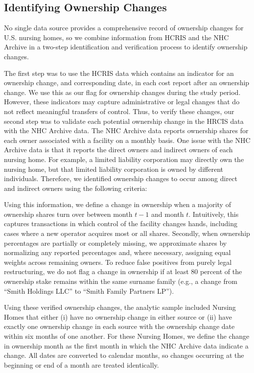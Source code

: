 \documentclass[12pt]{article}
\begin{document}
\subsection{Identifying Ownership Changes}

No single data source provides a comprehensive record of ownership changes for U.S. nursing homes, so we combine information from HCRIS and the NHC Archive in a two-step identification and verification process to identify ownership changes.

The first step was to use the HCRIS data which contains an indicator for an ownership change, and corresponding date, in each cost report after an ownership change. We use this as our flag for ownership changes during the study period. However, these indicators may capture administrative or legal changes that do not reflect meaningful transfers of control. Thus, to verify these changes, our second step was to validate each potential ownership change in the HRCIS data with the NHC Archive data. The NHC Archive data reports ownership shares for each owner associated with a facility on a monthly basis. One issue with the NHC Archive data is that it reports the direct owners and indirect owners of each nursing home. For example, a limited liability corporation may directly own the nursing home, but that limited liability corporation is owned by different individuals. Therefore, we identified ownership changes to occur among direct and indirect owners using the following criteria: 

Using this information, we define a change in ownership when a majority of ownership shares turn over between month $t-1$ and month $t$. Intuitively, this captures transactions in which control of the facility changes hands, including cases where a new operator acquires most or all shares. Secondly, when ownership percentages are partially or completely missing, we approximate shares by normalizing any reported percentages and, where necessary, assigning equal weights across remaining owners. To reduce false positives from purely legal restructuring, we do not flag a change in ownership if at least 80 percent of the ownership stake remains within the same surname family (e.g., a change from “Smith Holdings LLC” to “Smith Family Partners LP”). 

Using these verified ownership changes, the analytic sample included Nursing Homes that either (i) have no ownership change in either source or (ii) have exactly one ownership change in each source with the ownership change date within six months of one another. For these Nursing Homes, we define the change in ownership month as the first month in which the NHC Archive data indicate a change. All dates are converted to calendar months, so changes occurring at the beginning or end of a month are treated identically. 
\end{document}
